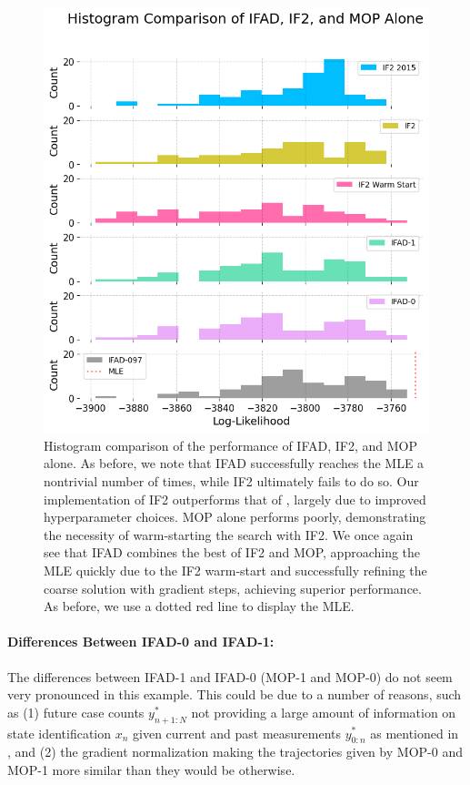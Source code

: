 \documentclass{article}
\begin{document}
\begin{figure}[t!]
    \centering
    \includegraphics[scale=0.7]{../imgs/095/hist.png}
    \caption{Histogram comparison of the performance of IFAD, IF2, and MOP alone. As before, we note that IFAD successfully reaches the MLE a nontrivial number of times, while IF2 ultimately fails to do so. Our implementation of IF2 outperforms that of \cite{ionides15}, largely due to improved hyperparameter choices. MOP alone performs poorly, demonstrating the necessity of warm-starting the search with IF2. 
    We once again see that IFAD combines the best of IF2 and MOP, approaching the MLE quickly due to the IF2 warm-start and successfully refining the coarse solution with gradient steps, achieving superior performance. As before, we use a dotted red line to display the MLE. }
    \label{fig:hist-all}
\end{figure}


\paragraph{Differences Between IFAD-0 and IFAD-1:} The differences between IFAD-1 and IFAD-0 (MOP-1 and MOP-0) do not seem very pronounced in this example. This could be due to a number of reasons, such as (1) future case counts $y_{{n+1}:N}^*$ not providing a large amount of information on state identification $x_n$ given current and past measurements $y_{0:n}^*$ as mentioned in \cite{corenflos21}, and (2) the gradient normalization making the trajectories given by MOP-0 and MOP-1 more similar than they would be otherwise. 
\end{document}
